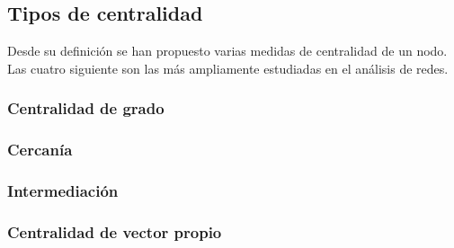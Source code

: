 \subsection{Tipos de centralidad}
Desde su definición se han propuesto varias medidas de centralidad de un nodo.
Las cuatro siguiente son las más ampliamente estudiadas en el análisis de redes.

\subsubsection{Centralidad de grado}
\subsubsection{Cercanía}
\subsubsection{Intermediación}
\subsubsection{Centralidad de vector propio}
